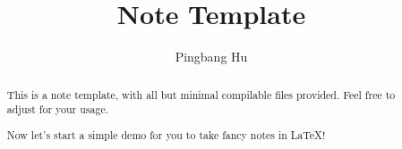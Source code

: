 \documentclass[a4paper]{report}
\author{Pingbang Hu}
\title{Note Template}
\begin{document}
\maketitle

\begin{abstract}
	This is a note template, with all but minimal compilable files provided. Feel free to adjust for your usage.

	Now let's start a simple demo for you to take fancy notes in \LaTeX!
\end{abstract}

\newpage

\tableofcontents


\newpage
\appendix
\appendixpage



\newpage
\printbibliography
\end{document}

